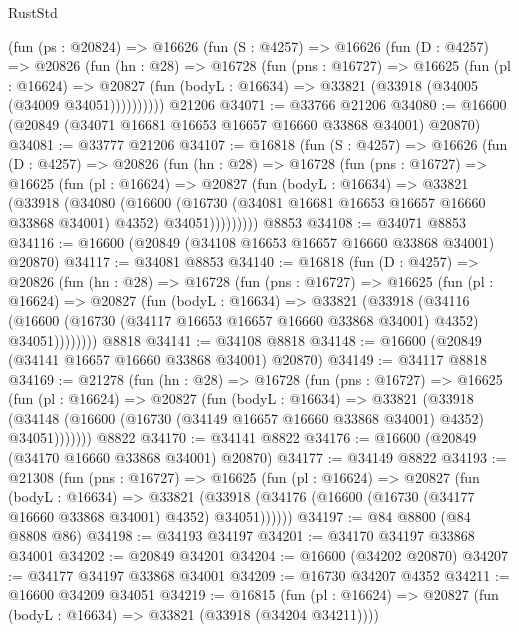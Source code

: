\begin{lexlean}{RustStd}
\begin{coremodule}
    (fun (ps : @20824) =>
    @16626
      (fun (S : @4257) =>
      @16626
        (fun (D : @4257) =>
        @20826
          (fun (hn : @28) =>
          @16728
            (fun (pns : @16727) =>
            @16625
              (fun (pl : @16624) =>
              @20827 (fun (bodyL : @16634) => @33821 (@33918 (@34005 (@34009 @34051))))))))))
    @21206
@34071 := @33766 @21206
@34080 := @16600 (@20849 (@34071 @16681 @16653 @16657 @16660 @33868 @34001) @20870)
@34081 := @33777 @21206
@34107 := @16818
    (fun (S : @4257) =>
    @16626
      (fun (D : @4257) =>
      @20826
        (fun (hn : @28) =>
        @16728
          (fun (pns : @16727) =>
          @16625
            (fun (pl : @16624) =>
            @20827
              (fun (bodyL : @16634) =>
              @33821
                (@33918
                  (@34080
                    (@16600
                      (@16730 (@34081 @16681 @16653 @16657 @16660 @33868 @34001) @4352)
                      @34051)))))))))
    @8853
@34108 := @34071 @8853
@34116 := @16600 (@20849 (@34108 @16653 @16657 @16660 @33868 @34001) @20870)
@34117 := @34081 @8853
@34140 := @16818
    (fun (D : @4257) =>
    @20826
      (fun (hn : @28) =>
      @16728
        (fun (pns : @16727) =>
        @16625
          (fun (pl : @16624) =>
          @20827
            (fun (bodyL : @16634) =>
            @33821
              (@33918
                (@34116
                  (@16600 (@16730 (@34117 @16653 @16657 @16660 @33868 @34001) @4352) @34051))))))))
    @8818
@34141 := @34108 @8818
@34148 := @16600 (@20849 (@34141 @16657 @16660 @33868 @34001) @20870)
@34149 := @34117 @8818
@34169 := @21278
    (fun (hn : @28) =>
    @16728
      (fun (pns : @16727) =>
      @16625
        (fun (pl : @16624) =>
        @20827
          (fun (bodyL : @16634) =>
          @33821
            (@33918
              (@34148 (@16600 (@16730 (@34149 @16657 @16660 @33868 @34001) @4352) @34051)))))))
    @8822
@34170 := @34141 @8822
@34176 := @16600 (@20849 (@34170 @16660 @33868 @34001) @20870)
@34177 := @34149 @8822
@34193 := @21308
    (fun (pns : @16727) =>
    @16625
      (fun (pl : @16624) =>
      @20827
        (fun (bodyL : @16634) =>
        @33821 (@33918 (@34176 (@16600 (@16730 (@34177 @16660 @33868 @34001) @4352) @34051))))))
@34197 := @84 @8800 (@84 @8808 @86)
@34198 := @34193 @34197
@34201 := @34170 @34197 @33868 @34001
@34202 := @20849 @34201
@34204 := @16600 (@34202 @20870)
@34207 := @34177 @34197 @33868 @34001
@34209 := @16730 @34207 @4352
@34211 := @16600 @34209 @34051
@34219 := @16815
    (fun (pl : @16624) => @20827 (fun (bodyL : @16634) => @33821 (@33918 (@34204 @34211))))

\end{coremodule}
\end{lexlean}
